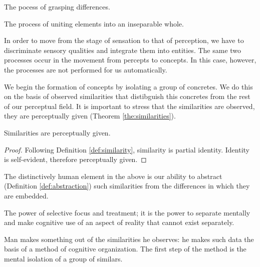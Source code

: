             \begin{definition}[Differentiation]
            \label{def:differentiation}
                The pocess of grasping differences.
            \end{definition}

            \begin{definition}[Integration]
            \label{def:integration}
                The process of uniting elements into an inseparable whole.
            \end{definition}

        In order to move from the stage of sensation to that of perception, we have to discriminate sensory qualities and integrate them into entities. The same two processes occur in the movement from percepts to concepts. In this case, however, the processes are not performed for us automatically.

        We begin the formation of concepts by isolating a group of concretes. We do this on the basis of observed similarities that distibguish this concretes from the rest of our perceptual field. It is important to stress that the similarities are observed, they are perceptually given (Theorem \ref{the:similarities}).

        \begin{theorem}
        \label{the:similarities}
            Similarities are perceptually given.
        \end{theorem}

        \begin{proof}
            Following Definition \ref{def:similarity}, similarity is partial identity. Identity is self-evident, therefore perceptually given.
        \end{proof}

        The distinctively human element in the above is our ability to abstract (Definition \ref{def:abstraction}) such similarities from the differences in which they are embedded.

            \begin{definition}[Abstraction]
            \label{def:abstraction}
                The power of selective focus and treatment; it is the power to separate mentally and make cognitive use of an aspect of reality that cannot exist separately.
            \end{definition}

        Man makes something out of the similarities he observes: he makes such data the basis of a method of cognitive organization. The first step of the method is the mental isolation of a group of similars.

